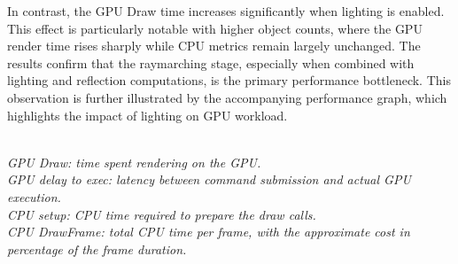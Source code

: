 \documentclass{rapportcs}
\begin{document}
        \noindent In contrast, the GPU Draw time increases significantly when lighting is enabled. This effect is particularly notable with higher object counts, where the GPU render time rises sharply while CPU metrics remain largely unchanged. The results confirm that the raymarching stage, especially when combined with lighting and reflection computations, is the primary performance bottleneck. This observation is further illustrated by the accompanying performance graph, which highlights the impact of lighting on GPU workload.
    
        \begin{table}[h]
            \centering
            \caption{Comparison between fragment shader and compute shader}
        \end{table}
        
        \vspace{-2ex}
        \noindent
        \begin{minipage}{\textwidth}
        \scriptsize
        \textit{\\
            GPU Draw: time spent rendering on the GPU.\\
            GPU delay to exec: latency between command submission and actual GPU execution.\\
            CPU setup: CPU time required to prepare the draw calls.\\
            CPU DrawFrame: total CPU time per frame, with the approximate cost in percentage of the frame duration.
        }
        \end{minipage}
    
\end{document}
